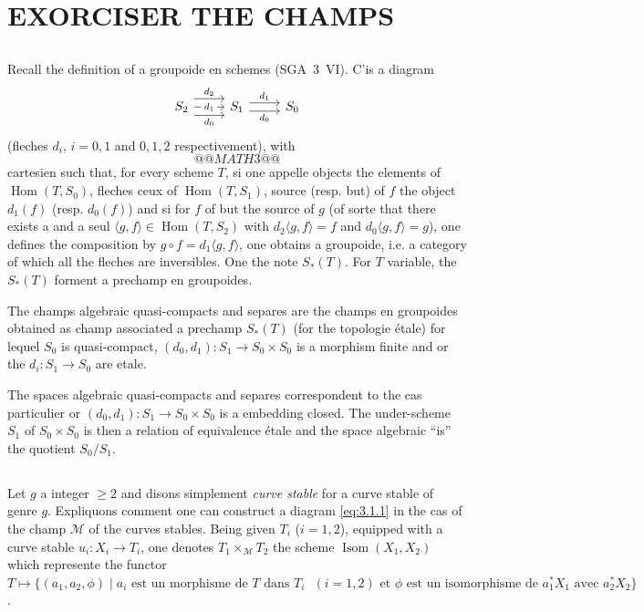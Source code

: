 \documentclass[12pt,a4paper]{article}
\theoremstyle{plain}
\theoremstyle{definition}
\theoremstyle{remark}
\DeclareMathOperator{\Isom}{Isom}
\DeclareMathOperator{\Hom}{Hom}
\begin{document}
\section{EXORCISER THE CHAMPS}

\subsection{} Recall the definition of a groupoide en schemes (SGA~3~VI). C'is a diagram
\begin{equation}\label{eq:3.1.1}
\begin{tikzcd}
S_2 \arrow[r, shift left=1.5ex, "d_2"] \arrow[r, "d_1"{description}] \arrow[r, shift right=1.5ex, "d_0"'] & S_1 \arrow[r, shift left=0.75ex, "d_1"] \arrow[r, shift right=0.75ex, "d_0"'] & S_0
\end{tikzcd}
\end{equation}
(fleches $d_i$, $i = 0,1$ and $0,1,2$ respectivement), with
\[
@@MATH3@@
\]
cartesien such that, for every scheme $T$, si one appelle objects the elements of $\Hom(T,S_0)$, fleches ceux of $\Hom(T,S_1)$, source (resp. but) of $f$ the object $d_1(f)$ (resp. $d_0(f)$) and si for $f$ of but the source of $g$ (of sorte that there exists a and a seul $\langle g,f \rangle \in \Hom(T,S_2)$ with $d_2\langle g,f \rangle = f$ and $d_0\langle g,f \rangle = g$), one defines the composition by $g \circ f = d_1\langle g,f \rangle$, one obtains a groupoide, i.e. a category of which all the fleches are inversibles. One the note $S_*(T)$. For $T$ variable, the $S_*(T)$ forment a prechamp en groupoides.

The champs algebraic quasi-compacts and separes are the champs en groupoides obtained as champ associated a prechamp $S_*(T)$ (for the topologie étale) for lequel $S_0$ is quasi-compact, $(d_0,d_1) : S_1 \to S_0 \times S_0$ is a morphism finite and or the $d_i : S_1 \to S_0$ are etale.

The spaces algebraic quasi-compacts and separes correspondent to the cas particulier or $(d_0,d_1) : S_1 \to S_0 \times S_0$ is a embedding closed. The under-scheme $S_1$ of $S_0 \times S_0$ is then a relation of equivalence étale and the space algebraic ``is'' the quotient $S_0/S_1$.

\subsection{} Let $g$ a integer $\geq 2$ and disons simplement \emph{curve stable} for a curve stable of genre $g$. Expliquons comment one can construct a diagram \eqref{eq:3.1.1} in the cas of the champ $\mathcal{M}$ of the curves stables. Being given $T_i$ ($i = 1,2$), equipped with a curve stable $u_i : X_i \to T_i$, one denotes $T_1 \times_{\mathcal{M}} T_2$ the scheme $\Isom(X_1, X_2)$ which represente the functor $T \mapsto \{(a_1, a_2, \phi) \mid a_i \text{ est un morphisme de } T \text{ dans } T_i \text{ } (i = 1,2) \text{ et } \phi \text{ est un isomorphisme de } a_1^* X_1 \text{ avec } a_2^* X_2\}$.
\end{document}
